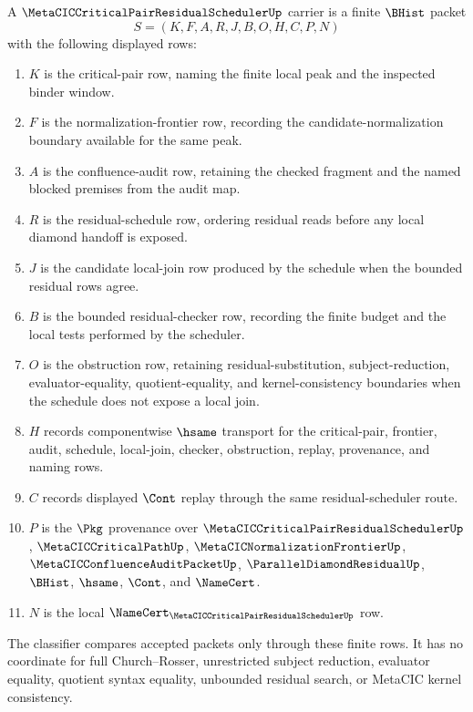 \begin{definition}
\label{def:metacic-critical-pair-residual-scheduler-carrier}
A $\MetaCICCriticalPairResidualSchedulerUp$ carrier is a finite $\BHist$ packet
$$
S=(K,F,A,R,J,B,O,H,C,P,N)
$$
with the following displayed rows:
\begin{enumerate}
\item $K$ is the critical-pair row, naming the finite local peak and the inspected binder window.
\item $F$ is the normalization-frontier row, recording the candidate-normalization boundary available for the same peak.
\item $A$ is the confluence-audit row, retaining the checked fragment and the named blocked premises from the audit map.
\item $R$ is the residual-schedule row, ordering residual reads before any local diamond handoff is exposed.
\item $J$ is the candidate local-join row produced by the schedule when the bounded residual rows agree.
\item $B$ is the bounded residual-checker row, recording the finite budget and the local tests performed by the scheduler.
\item $O$ is the obstruction row, retaining residual-substitution, subject-reduction, evaluator-equality, quotient-equality, and kernel-consistency boundaries when the schedule does not expose a local join.
\item $H$ records componentwise $\hsame$ transport for the critical-pair, frontier, audit, schedule, local-join, checker, obstruction, replay, provenance, and naming rows.
\item $C$ records displayed $\Cont$ replay through the same residual-scheduler route.
\item $P$ is the $\Pkg$ provenance over $\MetaCICCriticalPairResidualSchedulerUp$, $\MetaCICCriticalPathUp$, $\MetaCICNormalizationFrontierUp$, $\MetaCICConfluenceAuditPacketUp$, $\ParallelDiamondResidualUp$, $\BHist$, $\hsame$, $\Cont$, and $\NameCert$.
\item $N$ is the local $\NameCert_{\MetaCICCriticalPairResidualSchedulerUp}$ row.
\end{enumerate}
The classifier compares accepted packets only through these finite rows. It has no coordinate for full Church--Rosser, unrestricted subject reduction, evaluator equality, quotient syntax equality, unbounded residual search, or MetaCIC kernel consistency.
\end{definition}

